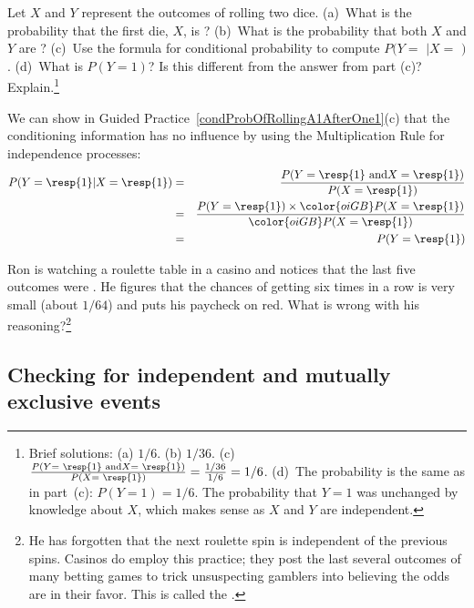 \begin{exercise} \label{condProbOfRollingA1AfterOne1}
Let $X$ and $Y$ represent the outcomes of rolling two dice. (a)~What is the probability that the first die, $X$, is ? (b)~What is the probability that both $X$ and $Y$ are ? (c)~Use the formula for conditional probability to compute $P(Y =$  $| X = $ $)$. (d)~What is $P(Y=1)$? Is this different from the answer from part (c)? Explain.\footnote{Brief solutions: (a) $1/6$. (b) $1/36$. (c)~$\frac{P(Y = \text{ \resp{1} and}X=\text{ \resp{1}})}{P(X=\text{ \resp{1}})} = \frac{1/36}{1/6} = 1/6$. (d)~The probability is the same as in part~(c): $P(Y=1)=1/6$. The probability that $Y=1$ was unchanged by knowledge about $X$, which makes sense as $X$ and $Y$ are independent.}
\end{exercise}

We can show in Guided Practice~\ref{condProbOfRollingA1AfterOne1}(c) that the conditioning information has no influence by using the Multiplication Rule for independence processes:
\begin{eqnarray*}
P(Y=\text{\resp{1}}|X=\text{\resp{1}})
	&=& \frac{P(Y=\text{\resp{1} and}X=\text{\resp{1}})}{P(X=\text{\resp{1}})} \\
	&=& \frac{P(Y=\text{\resp{1}})\times \color{oiGB}P(X=\text{\resp{1}})}{\color{oiGB}P(X=\text{\resp{1}})} \\
	&=& P(Y=\text{\resp{1}}) \\
\end{eqnarray*}

\begin{exercise}
Ron is watching a roulette table in a casino and notices that the last five outcomes were . He figures that the chances of getting  six times in a row is very small (about $1/64$) and puts his paycheck on red. What is wrong with his reasoning?\footnote{He has forgotten that the next roulette spin is independent of the previous spins. Casinos do employ this practice; they post the last several outcomes of many betting games to trick unsuspecting gamblers into believing the odds are in their favor. This is called the .}
\end{exercise}


\subsection{Checking for independent and mutually exclusive events}

